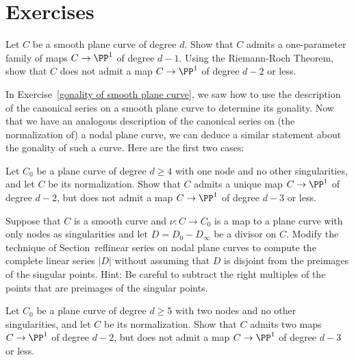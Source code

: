 \section{Exercises}

\begin{exercise}\label{gonality of smooth plane curve}
Let $C$ be a smooth plane curve of degree $d$. Show that $C$ admits a one-parameter family of maps $C \to \PP^1$ of degree $d-1$. Using the Riemann-Roch Theorem, show that $C$ does not admit a map $C \to \PP^1$ of degree $d-2$ or less.
\end{exercise}

In Exercise~\ref{gonality of smooth plane curve}, we saw how to use the description of the canonical series on a smooth plane curve to determine its gonality. Now that we have an analogous description of the canonical series on (the normalization of) a nodal plane curve, we can deduce a similar statement about the gonality of such a curve. Here are the first two cases: 

\begin{exercise}
Let $C_0$ be a plane curve of degree $d\geq 4$ with one node and no other singularities, and let $C$ be its normalization. Show that $C$ admits a unique map $C \to \PP^1$ of degree $d-2$, but does not admit a map $C \to \PP^1$ of degree $d-3$ or less.
\end{exercise}
\begin{exercise}\label{general case of divisors on nodal curves}
Suppose that $C$ is a smooth curve and $\nu: C \to C_0$ is a map to a plane curve with
only nodes as singularities and let $D = D_0-D_\infty$ be a divisor on $C$. Modify the 
technique of Section~ref{linear series on nodal plane curves} to compute the complete
linear series $|D|$ without assuming that $D$ is disjoint from the preimages of the singular
points. 
Hint: Be careful to subtract the right multiples of the points that are preimages of the singular
points.
\end{exercise}

\begin{exercise}
Let $C_0$ be a plane curve of degree $d\geq 5$ with two nodes and no other singularities, and let $C$ be its normalization. Show that $C$ admits two maps $C \to \PP^1$ of degree $d-2$, but does not admit a map $C \to \PP^1$ of degree $d-3$ or less.
\end{exercise}

